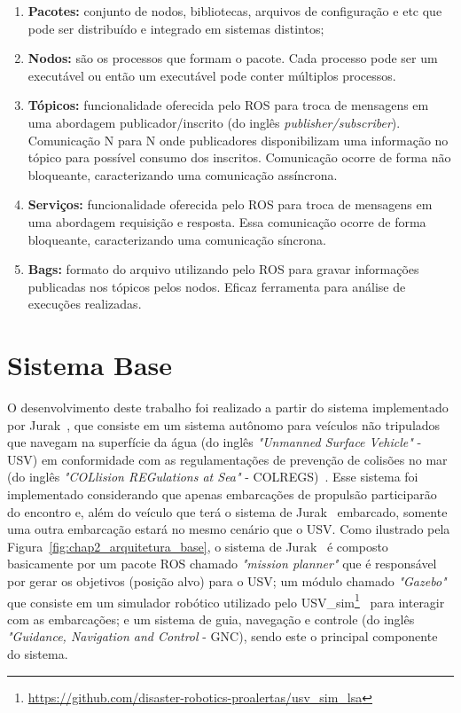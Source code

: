         \begin{enumerate}[label=\Alph*]
            \item \textbf{Pacotes:} conjunto de nodos, bibliotecas, arquivos de configuração e etc que pode ser distribuído e integrado em sistemas distintos;
            \item \textbf{Nodos:} são os processos que formam o pacote. Cada processo pode ser um executável ou então um executável pode conter múltiplos processos.
            \item \textbf{Tópicos:} funcionalidade oferecida pelo ROS para troca de mensagens em uma abordagem publicador/inscrito (do inglês \textit{publisher/subscriber}). Comunicação N para N onde publicadores disponibilizam uma informação no tópico para possível consumo dos inscritos. Comunicação ocorre de forma não bloqueante, caracterizando uma comunicação assíncrona. %
            \item \textbf{Serviços:} funcionalidade oferecida pelo ROS para troca de mensagens em uma abordagem requisição e resposta. Essa comunicação ocorre de forma bloqueante, caracterizando uma comunicação síncrona. %
            \item \textbf{Bags:} formato do arquivo utilizando pelo ROS para gravar informações publicadas nos tópicos pelos nodos. Eficaz ferramenta para análise de execuções realizadas.
        \end{enumerate}
    
        
    
    \section{Sistema Base} \label{subchap3:sistema_base}
        O desenvolvimento deste trabalho foi realizado a partir do sistema implementado por Jurak~\cite{Jurak2020COLREGS}, que consiste em um sistema autônomo para veículos não tripulados que navegam na superfície da água (do inglês \textit{"Unmanned Surface Vehicle"} - USV) em conformidade com as regulamentações de prevenção de colisões no mar (do inglês \textit{"COLlision REGulations at Sea"} - COLREGS)~\cite{COLREGS}. Esse sistema foi implementado considerando que apenas embarcações de propulsão participarão do encontro e, além do veículo que terá o sistema de Jurak~\cite{Jurak2020COLREGS} embarcado, somente uma outra embarcação estará no mesmo cenário que o USV. Como ilustrado pela Figura~\ref{fig:chap2_arquitetura_base}, o sistema de Jurak~\cite{Jurak2020COLREGS} é composto basicamente por um pacote ROS chamado \textit{"mission planner"} que é responsável por gerar os objetivos (posição alvo) para o USV; um módulo chamado \textit{"Gazebo"} que consiste em um simulador robótico utilizado pelo USV\_sim\footnote{\url{https://github.com/disaster-robotics-proalertas/usv\_sim\_lsa}}~\cite{Paravisi2018Toward} para interagir com as embarcações; e um sistema de guia, navegação e controle (do inglês \textit{"Guidance, Navigation and Control} - GNC), sendo este o principal componente do sistema.
        
